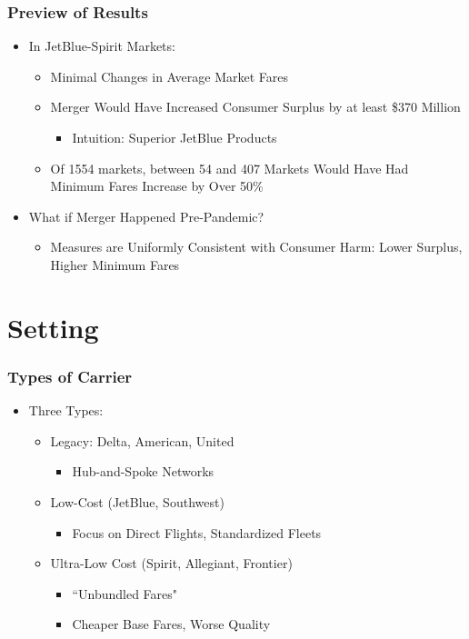 \documentclass[xcolor=dvipsnames]{beamer}
\begin{document}
    \begin{frame}
        \frametitle{Preview of Results}
        \begin{itemize}
                \item In JetBlue-Spirit Markets:
                \begin{itemize}
                \item Minimal Changes in Average Market Fares
                \item Merger Would Have Increased Consumer Surplus by at least \$370 Million
                \begin{itemize}
                    \item Intuition: Superior JetBlue Products
                \end{itemize}
                \item Of 1554 markets, between 54 and 407 Markets Would Have Had Minimum Fares Increase by Over 50\%    
                \end{itemize}
                \item What if Merger Happened Pre-Pandemic?
                \begin{itemize}
                    \item Measures are Uniformly Consistent with Consumer Harm: Lower Surplus, Higher Minimum Fares
                \end{itemize}
        \end{itemize}
    \end{frame}

    \section{Setting}
	\begin{frame}
		\frametitle{Types of Carrier}
		\begin{itemize}
			\item Three Types:
			\begin{itemize}
				\item Legacy: Delta, American, United
                \begin{itemize}
                    \item Hub-and-Spoke Networks
                \end{itemize}
				\item Low-Cost (JetBlue, Southwest)
				\begin{itemize}
					\item Focus on Direct Flights, Standardized Fleets
				\end{itemize}
				\item Ultra-Low Cost (Spirit, Allegiant, Frontier)
				\begin{itemize}
	            \item ``Unbundled Fares" 
                \item Cheaper Base Fares, Worse Quality    			\end{itemize}
			\end{itemize}
		\end{itemize}
	\end{frame}
\end{document}
